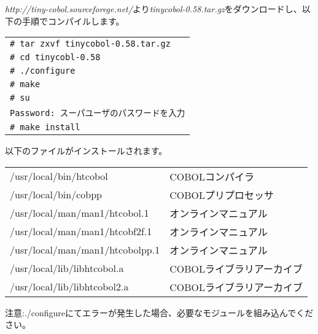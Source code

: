 {\it http://tiny-cobol.sourceforege.net/}より{\it tinycobol-0.58.tar.gz}をダウンロードし、以下の手順でコンパイルします。

\begin{tabular}{|l|}
\hline
\verb+# tar zxvf tinycobol-0.58.tar.gz+\\
\verb+# cd tinycobl-0.58+\\
\verb+# ./configure+\\
\verb+# make+\\
\verb+# su+\\
\verb+Password: スーパユーザのパスワードを入力+\\
\verb+# make install+\\
\hline
\end{tabular}

以下のファイルがインストールされます。

\begin{tabular}{ll}
/usr/local/bin/htcobol            &COBOLコンパイラ\\
/usr/local/bin/cobpp              &COBOLプリプロセッサ\\
/usr/local/man/man1/htcobol.1     &オンラインマニュアル\\
/usr/local/man/man1/htcobf2f.1    &オンラインマニュアル\\
/usr/local/man/man1/htcobolpp.1   &オンラインマニュアル\\
/usr/local/lib/libhtcobol.a       &COBOLライブラリアーカイブ\\
/usr/local/lib/libhtcobol2.a      &COBOLライブラリアーカイブ\\
\end{tabular}

注意:./configureにてエラーが発生した場合、必要なモジュールを組み込んでください。









